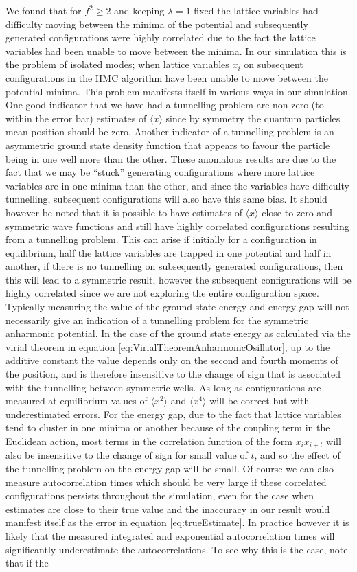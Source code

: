 \documentclass[12pt]{article}
\begin{document}
    We found that for $f^2\geq2$ and keeping $\lambda =1 $ fixed the lattice variables had difficulty moving between the minima of the potential and subsequently generated configurations were highly correlated due to the fact the lattice variables had been unable to move between the minima. In our simulation this is the problem of isolated modes; when lattice variables $x_i$ on subsequent configurations in the HMC algorithm have been unable to move between the potential minima. This problem manifests itself in various ways in our simulation. One good indicator that we have had a tunnelling problem are non zero (to within the error bar) estimates of $\langle x \rangle$ since by symmetry the quantum particles mean position should be zero. Another indicator of a tunnelling problem is an asymmetric ground state density function that appears to favour the particle being in one well more than the other. These anomalous results are due to the fact that we may be ``stuck'' generating configurations where more lattice variables are in one minima than the other, and since the variables have difficulty tunnelling, subsequent configurations will also have this same bias. It should however be noted that it is possible to have estimates of $\langle x \rangle$ close to zero and symmetric wave functions and still have highly correlated configurations resulting from a tunnelling problem. This can arise if initially for a configuration in equilibrium, half the lattice variables are trapped in one potential and half in another, if there is no tunnelling on subsequently generated configurations, then this will lead to a symmetric result, however the subsequent configurations will be highly correlated since we are not exploring the entire configuration space. Typically measuring the value of the ground state energy and energy gap will not necessarily give an indication of a tunnelling problem for the symmetric anharmonic potential. In the case of the ground state energy as calculated via the virial theorem in equation \ref{eq:VirialTheoremAnharmonicOsillator}, up to the additive constant the value depends only on the second and fourth moments of the position, and is therefore insensitive to the change of sign that is associated with the tunnelling between symmetric wells. As long as configurations are measured at equilibrium values of $\langle x^2 \rangle$ and $\langle x^4 \rangle$ will be correct but with underestimated errors. For the energy gap, due to the fact that lattice variables tend to cluster in one minima or another because of the coupling term in the Euclidean action, most terms in the correlation function of the form $x_ix_{i+t}$ will also be insensitive to the change of sign for small value of $t$, and so the effect of the tunnelling problem on the energy gap will be small. Of course we can also measure autocorrelation times which should be very large if these correlated configurations persists throughout the simulation, even for the case when estimates are close to their true value and the inaccuracy in our result would manifest itself as the error in equation \ref{eq:trueEstimate}. In practice however it is likely that the measured integrated and exponential autocorrelation times will significantly underestimate the autocorrelations. To see why this is the case, note that if the 
\end{document}
